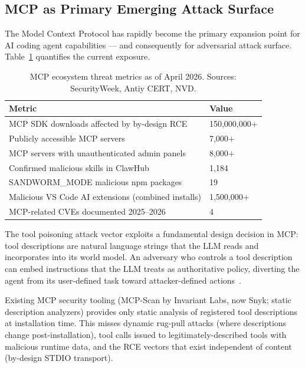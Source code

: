 \documentclass[11pt,letterpaper]{article}
\begin{document}
\subsection{MCP as Primary Emerging Attack Surface}

The Model Context Protocol has rapidly become the primary expansion point for AI coding
agent capabilities --- and consequently for adversarial attack surface.
Table~\ref{tab:mcp_stats} quantifies the current exposure.

\begin{table}[ht]
\centering
\small
\caption{MCP ecosystem threat metrics as of April 2026. Sources: SecurityWeek,
         Antiy CERT, NVD.}
\label{tab:mcp_stats}
\begin{tabular}{@{}ll@{}}
\toprule
\textbf{Metric} & \textbf{Value} \\
\midrule
MCP SDK downloads affected by by-design RCE & 150,000,000$+$ \\
Publicly accessible MCP servers & 7,000$+$ \\
MCP servers with unauthenticated admin panels & 8,000$+$ \\
Confirmed malicious skills in ClawHub & 1,184 \\
SANDWORM\_MODE malicious npm packages & 19 \\
Malicious VS Code AI extensions (combined installs) & 1,500,000$+$ \\
MCP-related CVEs documented 2025--2026 & 4 \\
\bottomrule
\end{tabular}
\end{table}

The tool poisoning attack vector exploits a fundamental design decision in MCP: tool
descriptions are natural language strings that the LLM reads and incorporates into its
world model. An adversary who controls a tool description can embed instructions that
the LLM treats as authoritative policy, diverting the agent from its user-defined task
toward attacker-defined actions~\citep{labs2025mcpscan}.

Existing MCP security tooling (MCP-Scan by Invariant Labs, now Snyk; static description
analyzers) provides only static analysis of registered tool descriptions at installation
time. This misses dynamic rug-pull attacks (where descriptions change post-installation),
tool calls issued to legitimately-described tools with malicious runtime data, and the
RCE vectors that exist independent of content (by-design STDIO transport).
\end{document}
